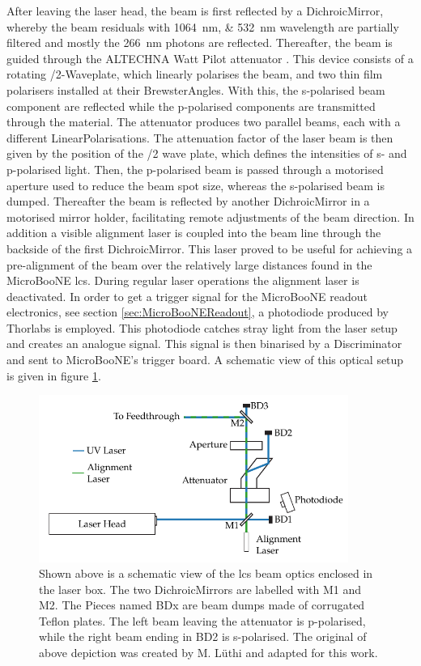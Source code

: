 After leaving the laser head, the beam is first reflected by a \gls{DichroicMirror}, whereby the beam residuals with \SIlist{1064;532}{\nano\metre} wavelength are partially filtered and mostly the \SI{266}{\nano\metre} photons are reflected. Thereafter, the beam is guided through the ALTECHNA Watt Pilot attenuator \cite{LCSAttenuator}. This device consists of a rotating \textlambda/2-\gls{Waveplate}, which linearly polarises the beam, and two thin film polarisers installed at their \glspl{BrewsterAngle}. With this, the s-polarised beam component are reflected while the p-polarised components are transmitted through the material. The attenuator produces two parallel beams, each with a different \glspl{LinearPolarisation}. The attenuation factor of the laser beam is then given by the position of the \textlambda/2 wave plate, which defines the intensities of s- and p-polarised light. Then, the p-polarised beam is passed through a motorised aperture used to reduce the beam spot size, whereas the s-polarised beam is dumped. Thereafter the beam is reflected by another \gls{DichroicMirror} in a motorised mirror holder, facilitating remote adjustments of the beam direction. In addition a visible alignment laser is coupled into the beam line through the backside of the first \gls{DichroicMirror}. This laser proved to be useful for achieving a pre-alignment of the beam over the relatively large distances found in the MicroBooNE \gls{lcs}. During regular laser operations the alignment laser is deactivated. In order to get a trigger signal for the MicroBooNE readout electronics, see section \ref{sec:MicroBooNEReadout}, a photodiode produced by Thorlabs is employed. This photodiode catches stray light from the laser setup and creates an analogue signal. This signal is then binarised by a \gls{Discriminator} and sent to MicroBooNE's trigger board. A schematic view of this optical setup is given in figure \ref{fig:BeamOptics}.
\begin{figure}[hbtp]
    \centering
    \includegraphics[width=0.9\textwidth]{images/MicroBooNE/LCSBeamOptics.pdf}     
    \caption[LCS Beam Optics]{Shown above is a schematic view of the \gls{lcs} beam optics enclosed in the laser box. The two \glspl{DichroicMirror} are labelled with M1 and M2. The Pieces named BDx are beam dumps made of corrugated Teflon plates. The left beam leaving the attenuator is p-polarised, while the right beam ending in BD2 is s-polarised. The original of above depiction was created by M. L\"uthi \cite{LArLaserPhDMatthias} and adapted for this work.}
    \label{fig:BeamOptics}
\end{figure}
